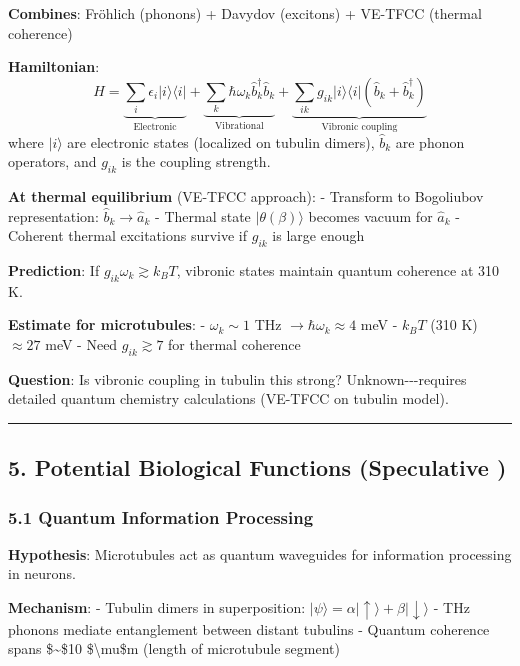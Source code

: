 \textbf{Combines}: Fröhlich (phonons) + Davydov (excitons) + VE-TFCC
(thermal coherence)

\textbf{Hamiltonian}:
\[\hat{H} = \underbrace{\sum_i \epsilon_i | i \rangle \langle i |}_{\text{Electronic}} + \underbrace{\sum_k \hbar \omega_k \hat{b}_k^\dagger \hat{b}_k}_{\text{Vibrational}} + \underbrace{\sum_{ik} g_{ik} | i \rangle \langle i | (\hat{b}_k + \hat{b}_k^\dagger)}_{\text{Vibronic coupling}}\]
where \(| i \rangle\) are electronic states (localized on tubulin
dimers), \(\hat{b}_k\) are phonon operators, and \(g_{ik}\) is the
coupling strength.

\textbf{At thermal equilibrium} (VE-TFCC approach): - Transform to
Bogoliubov representation: \(\hat{b}_k \rightarrow \hat{a}_k\) - Thermal
state \(|\theta(\beta)\rangle\) becomes vacuum for \(\hat{a}_k\) -
Coherent thermal excitations survive if \(g_{ik}\) is large enough

\textbf{Prediction}: If \(g_{ik} \omega_k \gtrsim k_B T\), vibronic
states maintain quantum coherence at 310 K.

\textbf{Estimate for microtubules}: - \(\omega_k \sim 1\) THz
\(\rightarrow \hbar \omega_k \approx 4\) meV - \(k_B T\) (310 K)
\(\approx 27\) meV - Need \(g_{ik} \gtrsim 7\) for thermal coherence

\textbf{Question}: Is vibronic coupling in tubulin this strong?
Unknown-\/-\/-requires detailed quantum chemistry calculations (VE-TFCC
on tubulin model).

\begin{center}\rule{0.5\linewidth}{0.5pt}\end{center}

\subsection{5. Potential Biological Functions (Speculative
)}\label{potential-biological-functions-speculative}

\subsubsection{5.1 Quantum Information
Processing}\label{quantum-information-processing}

\textbf{Hypothesis}: Microtubules act as quantum waveguides for
information processing in neurons.

\textbf{Mechanism}: - Tubulin dimers in superposition:
\(|\psi\rangle = \alpha|\uparrow\rangle + \beta|\downarrow\rangle\) -
THz phonons mediate entanglement between distant tubulins - Quantum
coherence spans \$\sim\$10 \$\textbackslash mu\$m (length of microtubule
segment)

